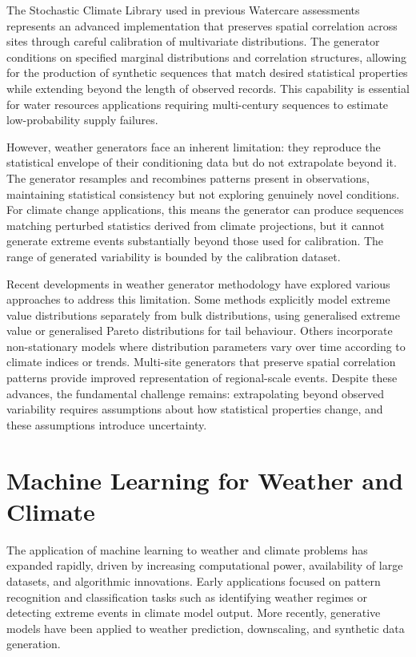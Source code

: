 The Stochastic Climate Library used in previous Watercare assessments represents an advanced 
implementation that preserves spatial correlation across sites through careful calibration of 
multivariate distributions. The generator conditions on specified marginal distributions and 
correlation structures, allowing for the production of synthetic sequences that match desired 
statistical properties while extending beyond the length of observed records. This capability 
is essential for water resources applications requiring multi-century sequences to estimate 
low-probability supply failures.

However, weather generators face an inherent limitation: they reproduce the statistical 
envelope of their conditioning data but do not extrapolate beyond it. The generator resamples 
and recombines patterns present in observations, maintaining statistical consistency but not 
exploring genuinely novel conditions. For climate change applications, this means the generator 
can produce sequences matching perturbed statistics derived from climate projections, but it 
cannot generate extreme events substantially beyond those used for calibration. The range of 
generated variability is bounded by the calibration dataset.

Recent developments in weather generator methodology have explored various approaches to 
address this limitation. Some methods explicitly model extreme value distributions separately 
from bulk distributions, using generalised extreme value or generalised Pareto distributions 
for tail behaviour. Others incorporate non-stationary models where distribution parameters vary 
over time according to climate indices or trends. Multi-site generators that preserve spatial 
correlation patterns provide improved representation of regional-scale events. Despite these 
advances, the fundamental challenge remains: extrapolating beyond observed variability requires 
assumptions about how statistical properties change, and these assumptions introduce 
uncertainty.

\section{Machine Learning for Weather and Climate}

The application of machine learning to weather and climate problems has expanded rapidly, 
driven by increasing computational power, availability of large datasets, and algorithmic 
innovations. Early applications focused on pattern recognition and classification tasks such 
as identifying weather regimes or detecting extreme events in climate model output. More 
recently, generative models have been applied to weather prediction, downscaling, and synthetic 
data generation.

